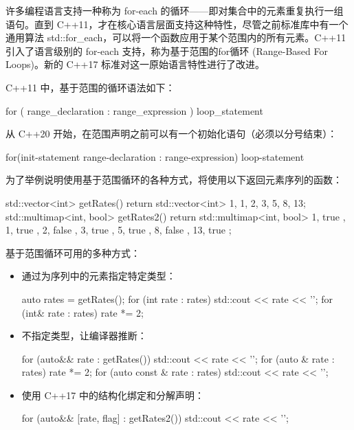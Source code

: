 
许多编程语言支持一种称为 for-each 的循环——即对集合中的元素重复执行一组语句。直到 C++11，才在核心语言层面支持这种特性，尽管之前标准库中有一个通用算法 std::for\_each，可以将一个函数应用于某个范围内的所有元素。C++11 引入了语言级别的 for-each 支持，称为基于范围的for循环 (Range-Based For Loops)。新的 C++17 标准对这一原始语言特性进行了改进。


C++11 中，基于范围的循环语法如下：

\begin{cpp}
for ( range_declaration : range_expression ) loop_statement
\end{cpp}

从 C++20 开始，在范围声明之前可以有一个初始化语句（必须以分号结束）：

\begin{cpp}
for(init-statement range-declaration : range-expression)
loop-statement
\end{cpp}

为了举例说明使用基于范围循环的各种方式，将使用以下返回元素序列的函数：

\begin{cpp}
std::vector<int> getRates()
{
    return std::vector<int> {1, 1, 2, 3, 5, 8, 13};
}
std::multimap<int, bool> getRates2()
{
    return std::multimap<int, bool> {
        { 1, true },
        { 1, true },
        { 2, false },
        { 3, true },
        { 5, true },
        { 8, false },
        { 13, true }
    };
}
\end{cpp}


基于范围循环可用的多种方式：

\begin{itemize}
\item
通过为序列中的元素指定特定类型：

\begin{cpp}
auto rates = getRates();
for (int rate : rates)
    std::cout << rate << '\n';
for (int& rate : rates)
    rate *= 2;
\end{cpp}

\item
不指定类型，让编译器推断：

\begin{cpp}
for (auto&& rate : getRates())
    std::cout << rate << '\n';
for (auto & rate : rates)
    rate *= 2;
for (auto const & rate : rates)
    std::cout << rate << '\n';
\end{cpp}

\item
使用 C++17 中的结构化绑定和分解声明：

\begin{cpp}
for (auto&& [rate, flag] : getRates2())
    std::cout << rate << '\n';
\end{cpp}
\end{itemize}



